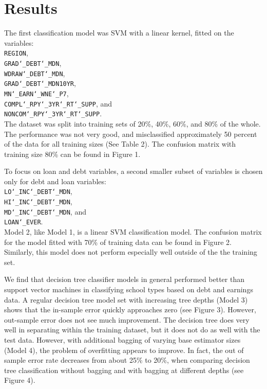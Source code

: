 \documentclass[10pt,twocolumn]{article}
\begin{document}
\section{Results}

The first classification model was SVM with a linear kernel, fitted on the variables:\\
\texttt{REGION},\\
\texttt{GRAD\char`_DEBT\char`_MDN},\\
\texttt{WDRAW\char`_DEBT\char`_MDN},\\
\texttt{GRAD\char`_DEBT\char`_MDN10YR},\\
\texttt{MN\char`_EARN\char`_WNE\char`_P7},\\
\texttt{COMPL\char`_RPY\char`_3YR\char`_RT\char`_SUPP}, and\\
\texttt{NONCOM\char`_RPY\char`_3YR\char`_RT\char`_SUPP}.\\

The dataset was split into
training sets of 20\%, 40\%, 60\%, and 80\% of the whole. The performance
was not very good, and misclassified approximately 50 percent of the data for all
training sizes (See Table 2). The confusion matrix with training size 80\% can be found
in Figure 1.

To focus on loan and debt variables, a second smaller subset of variables is chosen only
for debt and loan variables:\\
\texttt{LO\char`_INC\char`_DEBT\char`_MDN},\\
\texttt{HI\char`_INC\char`_DEBT\char`_MDN},\\
\texttt{MD\char`_INC\char`_DEBT\char`_MDN}, and\\
\texttt{LOAN\char`_EVER}.\\

Model 2, like Model 1, is a linear SVM classification model.
The confusion matrix for the model fitted with 70\% of training data can be found
in Figure 2. Similarly, this model does not perform especially well outside of the
the training set.

We find that decision tree classifier models in general performed better than
support vector machines in classifying school types based on debt and earnings data.
A regular decision tree model set with increasing tree depths (Model 3)
shows that the in-sample error quickly approaches zero (see Figure 3).
However, out-sample error does not see much improvement. The decision tree does
very well in separating within the training dataset, but it does not do as well
with the test data. However, with additional bagging of varying base estimator sizes (Model 4),
the problem of overfitting appears to improve. In fact, the out of sample error
rate decreases from about 25\% to 20\%, when comparing decision tree
classification without bagging and with bagging at different depths (see Figure 4).
\end{document}

